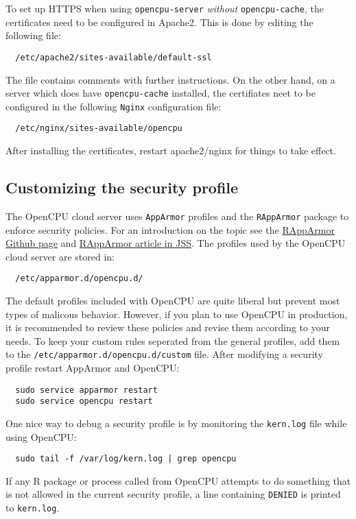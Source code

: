 \documentclass{scrartcl}\usepackage[]{graphicx}\usepackage[]{color}
\begin{document}
\noindent To set up HTTPS when using \texttt{opencpu-server} \emph{without} \texttt{opencpu-cache}, the certificates need to be configured in Apache2. This is done by editing the following file:

\begin{verbatim}
  /etc/apache2/sites-available/default-ssl
\end{verbatim}
The file contains comments with further instructions. On the other hand, on a server which does have \texttt{opencpu-cache} installed, the certifiates neet to be configured in the following \texttt{Nginx} configuration file: 

\begin{verbatim}
  /etc/nginx/sites-available/opencpu
\end{verbatim}

\noindent After installing the certificates, restart apache2/nginx for things to take effect.

\subsection{Customizing the security profile}
\label{security}

The OpenCPU cloud server uses \texttt{AppArmor} profiles and the \texttt{RAppArmor} package to enforce security policies. For an introduction on the topic see the \href{https://github.com/jeroenooms/RAppArmor#readme}{RAppArmor Github page} and \href{http://arxiv.org/abs/1303.4808}{RAppArmor article in JSS}. The profiles used by the OpenCPU cloud server are stored in:

\begin{verbatim}
  /etc/apparmor.d/opencpu.d/
\end{verbatim}
The default profiles included with OpenCPU are quite liberal but prevent most types of malicous behavior. However, if you plan to use OpenCPU in production, it is recommended to review these policies and revise them according to your needs. To keep your custom rules seperated from the general profiles, add them to the \texttt{/etc/apparmor.d/opencpu.d/custom} file. After modifying a security profile restart AppArmor and OpenCPU:

\begin{verbatim}
  sudo service apparmor restart
  sudo service opencpu restart
\end{verbatim}
One nice way to debug a security profile is by monitoring the \texttt{kern.log} file while using OpenCPU:

\begin{verbatim}
  sudo tail -f /var/log/kern.log | grep opencpu
\end{verbatim}
If any R package or process called from OpenCPU attempts to do something that is not allowed in the current security profile, a line containing \texttt{DENIED} is printed to \texttt{kern.log}.
\end{document}
